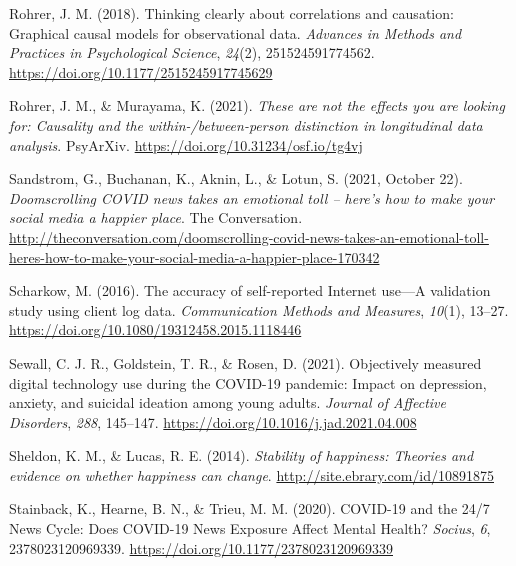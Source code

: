 \documentclass[
  man,mask,floatsintext]{apa7}
\newlength{\cslhangindent}
\newlength{\cslentryspacingunit} %
\newenvironment{CSLReferences}[2] %
 {%
  \setlength{\parindent}{0pt}
  \ifodd #1
  \let\oldpar\par
  \def\par{\hangindent=\cslhangindent\oldpar}
  \fi
  \setlength{\parskip}{#2\cslentryspacingunit}
 }%
 {}
\begin{document}
\begin{CSLReferences}{1}{0}
\leavevmode{}%
Rohrer, J. M. (2018). Thinking clearly about correlations and causation: {Graphical} causal models for observational data. \emph{Advances in Methods and Practices in Psychological Science}, \emph{24}(2), 251524591774562. \url{https://doi.org/10.1177/2515245917745629}

\leavevmode{}%
Rohrer, J. M., \& Murayama, K. (2021). \emph{These are not the effects you are looking for: {Causality} and the within-/between-person distinction in longitudinal data analysis}. {PsyArXiv}. \url{https://doi.org/10.31234/osf.io/tg4vj}

\leavevmode{}%
Sandstrom, G., Buchanan, K., Aknin, L., \& Lotun, S. (2021, October 22). \emph{Doomscrolling {COVID} news takes an emotional toll -- here's how to make your social media a happier place}. {The Conversation}. \url{http://theconversation.com/doomscrolling-covid-news-takes-an-emotional-toll-heres-how-to-make-your-social-media-a-happier-place-170342}

\leavevmode{}%
Scharkow, M. (2016). The accuracy of self-reported {Internet} use---{A} validation study using client log data. \emph{Communication Methods and Measures}, \emph{10}(1), 13--27. \url{https://doi.org/10.1080/19312458.2015.1118446}

\leavevmode{}%
Sewall, C. J. R., Goldstein, T. R., \& Rosen, D. (2021). Objectively measured digital technology use during the {COVID-19} pandemic: {Impact} on depression, anxiety, and suicidal ideation among young adults. \emph{Journal of Affective Disorders}, \emph{288}, 145--147. \url{https://doi.org/10.1016/j.jad.2021.04.008}

\leavevmode{}%
Sheldon, K. M., \& Lucas, R. E. (2014). \emph{Stability of happiness: Theories and evidence on whether happiness can change}. \url{http://site.ebrary.com/id/10891875}

\leavevmode{}%
Stainback, K., Hearne, B. N., \& Trieu, M. M. (2020). {COVID-19} and the 24/7 {News Cycle}: {Does COVID-19 News Exposure Affect Mental Health}? \emph{Socius}, \emph{6}, 2378023120969339. \url{https://doi.org/10.1177/2378023120969339}


\end{CSLReferences}
\end{document}

